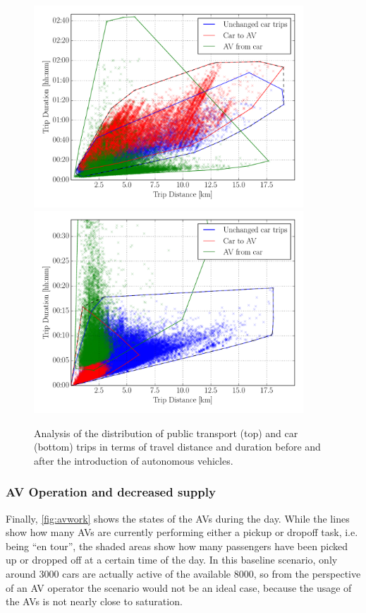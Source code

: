 \begin{figure}
    \centering
    \includegraphics[width=0.9\textwidth]{figures/changes_pt.pdf}
    \includegraphics[width=0.9\textwidth]{figures/changes_car.pdf}
    \caption{Analysis of the distribution of public transport (top) and car (bottom) trips
    in terms of travel distance and duration before and after the introduction of
    autonomous vehicles.}
    \label{fig:changes_modes}
\end{figure}

\subsubsection{AV Operation and decreased supply}

Finally, \cref{fig:avwork} shows the states of the AVs during the day. While the
lines show how many AVs are currently performing either a pickup or dropoff task,
i.e. being ``en tour'', the shaded areas show how many passengers have been picked
up or dropped off at a certain time of the day. In this baseline scenario, only
around 3000 cars are actually active of the available 8000, so from the perspective
of an AV operator the scenario would not be an ideal case, because the
usage of the AVs is not nearly close to saturation.

